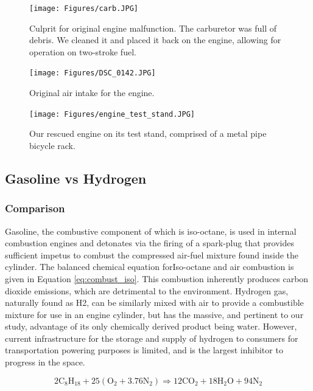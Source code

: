\documentclass[conf]{new-aiaa}
\begin{document}
\begin{figure}[H]
    \centering
    \texttt{[image: Figures/carb.JPG]}
    \caption{Culprit for original engine malfunction. The carburetor was full of debris. We cleaned it and placed it back on the engine, allowing for operation on two-stroke fuel.}
    \label{fig:carb}
\end{figure}

\begin{figure}[H]
    \centering
    \texttt{[image: Figures/DSC\_0142.JPG]}
    \caption{Original air intake for the engine.}
    \label{fig:air_intake}
\end{figure}

\begin{figure}[H]
    \centering
    \texttt{[image: Figures/engine\_test\_stand.JPG]}
    \caption{Our rescued engine on its test stand, comprised of a metal pipe bicycle rack.}
    \label{fig:test_stand}
\end{figure}



\subsection{Gasoline vs Hydrogen}
\subsubsection{Comparison}
Gasoline, the combustive component of which is iso-octane, is used in internal combustion engines and detonates via the firing of a spark-plug that provides sufficient impetus to combust the compressed air-fuel mixture found inside the cylinder. The balanced chemical equation forIso-octane and air combustion is given in Equation \ref{eq:combust_iso}. This combustion inherently produces carbon dioxide emissions, which are detrimental to the environment. Hydrogen gas, naturally found as H2, can be similarly mixed with air to provide a combustible mixture for use in an engine cylinder, but has the massive, and pertinent to our study, advantage of its only chemically derived product being water.  However, current infrastructure for the storage and supply of hydrogen to consumers for transportation powering purposes is limited, and is the largest inhibitor to progress in the space.

\begin{equation}
\label{eq:combust_iso}
    2\text{C}_8\text{H}_{18} + 25(\text{O}_2 + 3.76\text{N}_2) \Rightarrow 12\text{CO}_2 + 18\text{H}_2\text{O} + 94\text{N}_2
\end{equation}
\end{document}
